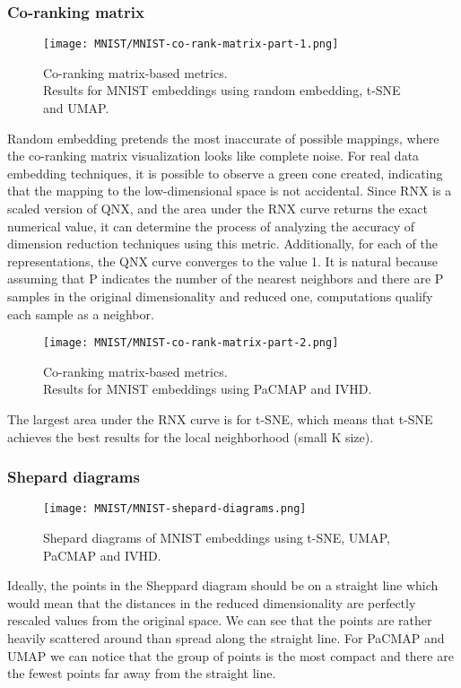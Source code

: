 \documentclass[12pt]{article}
\begin{document}
\clearpage
\subsubsection{Co-ranking matrix}
\begin{figure}[h]
    \centering
    \texttt{[image: MNIST/MNIST-co-rank-matrix-part-1.png]}
    \caption{Co-ranking matrix-based metrics. \\ Results for MNIST embeddings using random embedding, t-SNE and UMAP.}
\end{figure}
Random embedding pretends the most inaccurate of possible mappings, where the co-ranking matrix visualization looks like complete noise. For real data embedding techniques, it is possible to observe a green cone created, indicating that the mapping to the low-dimensional space is not accidental. Since RNX is a scaled version of QNX, and the area under the RNX curve returns the exact numerical value, it can determine the process of analyzing the accuracy of dimension reduction techniques using this metric. Additionally, for each of the representations, the QNX curve converges to the value 1. It is natural because assuming that P indicates the number of the nearest neighbors and there are P samples in the original dimensionality and reduced one, computations qualify each sample as a neighbor.

\clearpage
\begin{figure}[h]
    \centering
    \texttt{[image: MNIST/MNIST-co-rank-matrix-part-2.png]}
    \caption{Co-ranking matrix-based metrics. \\ Results for MNIST embeddings using PaCMAP and IVHD.}
\end{figure}
The largest area under the RNX curve is for t-SNE, which means that t-SNE achieves the best results for the local neighborhood (small K size).

\clearpage
\subsubsection{Shepard diagrams}

\begin{figure}[h]
    \centering
    \texttt{[image: MNIST/MNIST-shepard-diagrams.png]}
    \caption{Shepard diagrams of MNIST embeddings using t-SNE, UMAP, PaCMAP and IVHD.}
\end{figure}
Ideally, the points in the Sheppard diagram should be on a straight line which would mean that the distances in the reduced dimensionality are perfectly rescaled values from the original space. We can see that the points are rather heavily scattered around than spread along the straight line. For PaCMAP and UMAP we can notice that the group of points is the most compact and there are the fewest points far away from the straight line.
\end{document}
